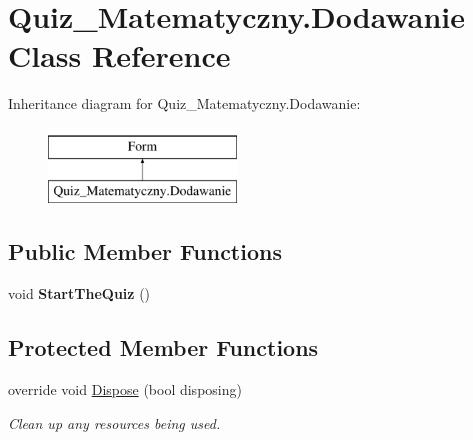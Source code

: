 \hypertarget{class_quiz___matematyczny_1_1_dodawanie}{}\section{Quiz\+\_\+\+Matematyczny.\+Dodawanie Class Reference}
\label{class_quiz___matematyczny_1_1_dodawanie}
Inheritance diagram for Quiz\+\_\+\+Matematyczny.\+Dodawanie\+:\begin{figure}[H]
\begin{center}
\leavevmode
\includegraphics[height=2.000000cm]{class_quiz___matematyczny_1_1_dodawanie}
\end{center}
\end{figure}
\subsection*{Public Member Functions}
\begin{DoxyCompactItemize}
\item 
\mbox{\label{class_quiz___matematyczny_1_1_dodawanie_a870bea0154fc7aaed7fecb3dbdc8de06}} 
void {\bfseries Start\+The\+Quiz} ()
\end{DoxyCompactItemize}
\subsection*{Protected Member Functions}
\begin{DoxyCompactItemize}
\item 
override void \mbox{\hyperlink{class_quiz___matematyczny_1_1_dodawanie_a8f3cc785d2b35820abfebd5dc4101c18}{Dispose}} (bool disposing)
\begin{DoxyCompactList}\small\item\em Clean up any resources being used. \end{DoxyCompactList}\end{DoxyCompactItemize}
